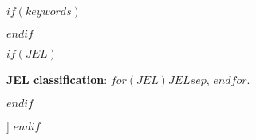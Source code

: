 \begin{@twocolumnfalse}
\begin{minipage}{\dimexpr\paperwidth-6.5cm}
\begin{abstract}
\begin{normalsize}
\end{normalsize}
\end{abstract}
$if(keywords)$
\begin{flushleft}
\setlength{}
\end{flushleft}
$endif$
\end{minipage}

$if(JEL)$
\centering\begin{minipage}{\dimexpr\paperwidth-8cm}
\begin{flushleft}
{\setlength\parindent{30pt}
\hspace{\parindent}\small\textbf{JEL classification}: {$for(JEL)$$JEL$$sep$, $endfor$}.}
\end{flushleft}
\end{minipage}
$endif$
\vspace{3em}
\end{@twocolumnfalse}]
\makeatother
$endif$